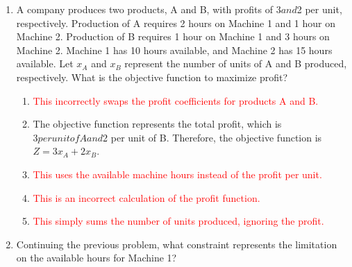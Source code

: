 \documentclass{article}%
\newcommand{\incorrect}[1]{\textcolor{red}{#1}}
\begin{document}
\begin{enumerate}
\begin{enumerate}
\item Shadow prices, or dual variables, represent the marginal increase in the objective function (profit) that would result from a one-unit increase in the availability of the corresponding resource.  A high shadow price indicates that the resource is highly constrained and that increasing its availability would significantly improve profit.  This information is crucial for resource allocation decisions, as it helps prioritize the acquisition or improvement of the most valuable resources.%
\item \incorrect{Shadow prices are not the unit cost of products.  The unit cost is the cost of producing one unit of a product, which is a different concept.}%
\item \incorrect{Shadow prices are a fundamental concept in linear programming duality and are applicable to a wide range of problems, including production planning problems.}%
\end{enumerate}%
\vspace{1em}%
\item A company produces two products, A and B, with profits of $3 and $2 per unit, respectively.  Production of A requires 2 hours on Machine 1 and 1 hour on Machine 2. Production of B requires 1 hour on Machine 1 and 3 hours on Machine 2. Machine 1 has 10 hours available, and Machine 2 has 15 hours available. Let $x_A$ and $x_B$ represent the number of units of A and B produced, respectively. What is the objective function to maximize profit?%
\begin{enumerate}%
\item \incorrect{This incorrectly swaps the profit coefficients for products A and B.}%
\item The objective function represents the total profit, which is $3 per unit of A and $2 per unit of B. Therefore, the objective function is $Z = 3x_A + 2x_B$.%
\item \incorrect{This uses the available machine hours instead of the profit per unit.}%
\item \incorrect{This is an incorrect calculation of the profit function.}%
\item \incorrect{This simply sums the number of units produced, ignoring the profit.}%
\end{enumerate}%
\vspace{1em}%
\item Continuing the previous problem, what constraint represents the limitation on the available hours for Machine 1?%
\begin{enumerate}%

\end{enumerate}
\end{enumerate}
\end{document}
